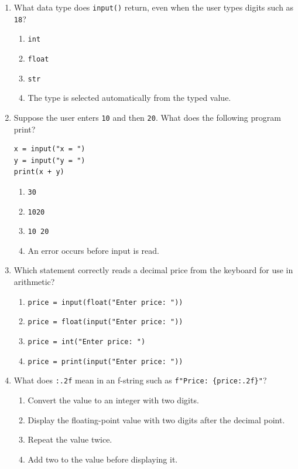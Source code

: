\documentclass[11pt,a4paper]{article}
\begin{document}
\begin{enumerate}[label=\textbf{Q\arabic*.},leftmargin=2em,itemsep=2pt,topsep=1pt]
\newpage


\item What data type does \texttt{input()} return, even when the user types digits such as \texttt{18}?
\begin{enumerate}[label=\Alph*.,leftmargin=2em]
  \item \texttt{int}
  \item \texttt{float}
  \item \texttt{str}
  \item The type is selected automatically from the typed value.
\end{enumerate}

\item Suppose the user enters \texttt{10} and then \texttt{20}. What does the following program print?
\begin{lstlisting}
x = input("x = ")
y = input("y = ")
print(x + y)
\end{lstlisting}
\begin{enumerate}[label=\Alph*.,leftmargin=2em]
  \item \texttt{30}
  \item \texttt{1020}
  \item \texttt{10 20}
  \item An error occurs before input is read.
\end{enumerate}

\item Which statement correctly reads a decimal price from the keyboard for use in arithmetic?
\begin{enumerate}[label=\Alph*.,leftmargin=2em]
  \item \texttt{price = input(float("Enter price: "))}
  \item \texttt{price = float(input("Enter price: "))}
  \item \texttt{price = int("Enter price: ")}
  \item \texttt{price = print(input("Enter price: "))}
\end{enumerate}

\item What does \texttt{:.2f} mean in an f-string such as \texttt{f"Price: \{price:.2f\}"}?
\begin{enumerate}[label=\Alph*.,leftmargin=2em]
  \item Convert the value to an integer with two digits.
  \item Display the floating-point value with two digits after the decimal point.
  \item Repeat the value twice.
  \item Add two to the value before displaying it.
\end{enumerate}


\end{enumerate}
\end{document}
